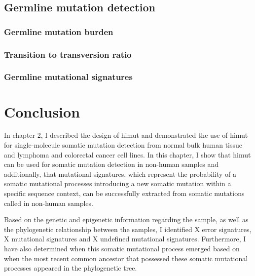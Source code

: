 \subsection{Germline  mutation detection}

\subsubsection{Germline mutation burden}

\subsubsection{Transition to transversion ratio}

\subsubsection{Germline mutational signatures}

\section{Conclusion}

In chapter 2, I described the design of himut and demonstrated the use of himut for single-molecule somatic mutation detection from normal bulk human tissue and lymphoma and colorectal cancer cell lines. In this chapter, I show that himut can be used for somatic mutation detection in non-human samples and additionally, that mutational signatures, which represent the probability of a somatic mutational processes introducing a new somatic mutation within a specific sequence context, can be successfully extracted from somatic mutations called in non-human samples. 

Based on the genetic and epigenetic information regarding the sample, as well as the phylogenetic relationship between the samples, I identified X error signatures, X mutational signatures and X undefined mutational signatures. Furthermore, I have also determined when this somatic mutational process emerged based on when the most recent common ancestor that possessed these somatic mutational processes appeared in the phylogenetic tree. 


